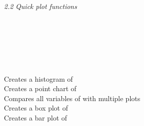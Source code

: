 \textit{2.2 Quick plot functions} \\
\\
\begin{minipage}[t]{.4\textwidth}
\vspace*{-8pt}
 \\
 \\
 \\	 
 \\
\end{minipage}
\begin{minipage}[t]{.6\textwidth}
Creates a histogram of  \\
Creates a point chart of  \\
Compares all variables of  with multiple plots \\
Creates a box plot of  \\
Creates a bar plot of 
\end{minipage}
\vspace*{.5cm}

